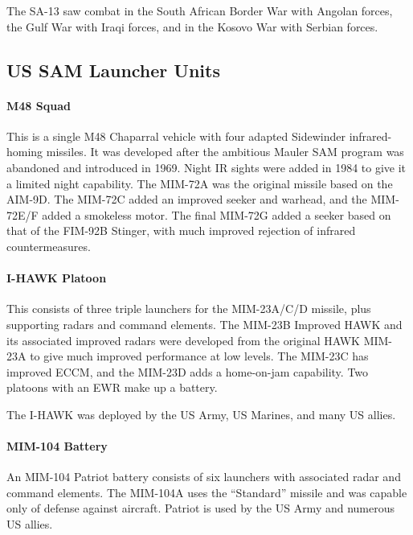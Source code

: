 The SA-13 saw combat in the South African Border War with Angolan forces, the Gulf War with Iraqi forces, and in the Kosovo War with Serbian forces.

\subsection{US SAM Launcher Units}

\paragraph{M48 Squad}

This is a single M48 Chaparral vehicle with four adapted Sidewinder infrared-homing missiles. It was developed after the ambitious Mauler SAM program was abandoned and introduced in 1969. Night IR sights were added in 1984 to give it a limited night capability. The MIM-72A was the original missile based on the AIM-9D. The MIM-72C added an improved seeker and warhead, and the MIM-72E/F added a smokeless motor. The final MIM-72G added a seeker based on that of the FIM-92B Stinger, with much improved rejection of infrared countermeasures.

\paragraph{I-HAWK Platoon}

This consists of three triple launchers for the MIM-23A/C/D missile, plus supporting radars and command elements.
The MIM-23B Improved HAWK and its associated improved radars were developed from the original HAWK MIM-23A to give much improved performance at low levels.
The MIM-23C has improved ECCM, and the MIM-23D adds a home-on-jam capability.
Two platoons with an EWR make up a battery.

The I-HAWK was deployed by the US Army, US Marines, and many US allies.

\paragraph{MIM-104 Battery}

An MIM-104 Patriot battery consists of six launchers with associated radar and command elements.
The MIM-104A uses the “Standard” missile and was capable only of defense against aircraft.
Patriot is used by the US Army and numerous US allies.

\begin{table}[p]
    \caption*{\hypertarget{table:sam-launcher-unit}{SAM Launcher Unit Table}}
    \centering
    \footnotesize
    
    \label{table:sam-launcher-units}
\end{table}
